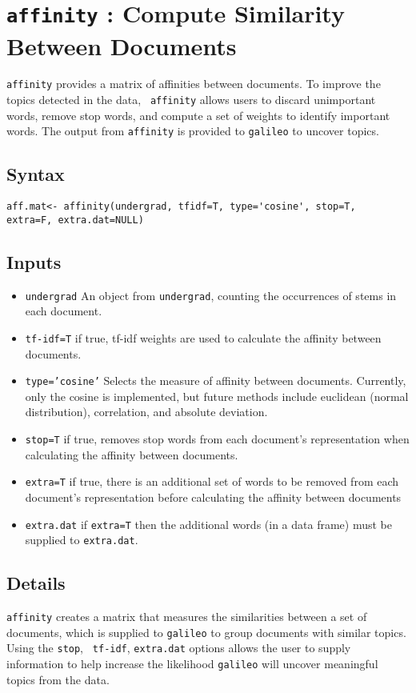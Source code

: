 \documentclass[12pt,letterpaper]{article}
\begin{document}
\section*{{\tt affinity} : Compute Similarity Between Documents}
\label{affinity} {\tt affinity} provides a matrix of affinities
between documents.  To improve the topics detected in the data, {\tt
affinity} allows users to discard unimportant words, remove stop
words, and compute a set of weights to identify important words. The
output from {\tt affinity} is provided to {\tt galileo} to uncover
topics.
\subsection*{Syntax}
\begin{verbatim}
aff.mat<- affinity(undergrad, tfidf=T, type='cosine', stop=T,
extra=F, extra.dat=NULL)
\end{verbatim}
\subsection*{Inputs}
\begin{itemize}
\item{{\tt undergrad}} An object from {\tt undergrad}, counting the
occurrences of stems in each document.
\item{{\tt tf-idf=T}} if true, tf-idf weights are used to calculate
the affinity between documents.
\item{{\tt type='cosine'}} Selects the measure of affinity between
documents.  Currently, only the cosine is implemented, but future
methods include euclidean (normal distribution), correlation, and
absolute deviation.
\item{{\tt stop=T}} if true, removes stop words from each document's
representation when calculating the affinity between documents.
\item{{\tt extra=T}} if true, there is an additional set of words to
be removed from each document's representation before calculating
the affinity between documents
\item{{\tt extra.dat}} if {\tt extra=T} then the additional words
(in a data frame) must be supplied to {\tt extra.dat}.
\end{itemize}

\subsection*{Details}
{\tt affinity} creates a matrix that measures the similarities
between a set of documents, which is supplied to {\tt galileo} to
group documents with similar topics.  Using the {\tt stop}, {\tt
tf-idf}, {\tt extra.dat} options allows the user to supply
information to help increase the likelihood {\tt galileo} will
uncover meaningful topics from the data.
\end{document}
